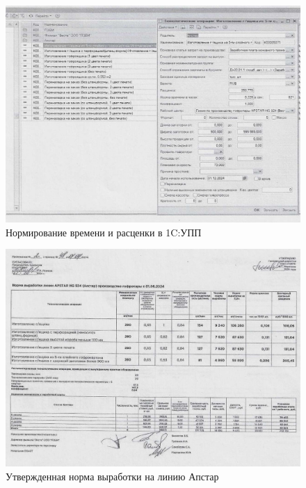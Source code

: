 \begin{figure}
\begin{center}
\includegraphics[height=0.6\textheight, width=1.3\textwidth, angle=90, keepaspectratio]{Pics/XI.12.jpg}
\end{center}
\caption{Нормирование времени и расценки в 1C:УПП}
\label{pic:XI.12.jpg}
\end{figure}
\clearpage

\begin{figure}
\begin{center}
\includegraphics[height=0.6\textheight, width=1.3\textwidth, angle=90, keepaspectratio]{Pics/XI.11.jpg}
\end{center}
\caption{Утвержденная норма выработки на линию Апстар}
\label{pic:XI.11.jpg}
\end{figure}
\clearpage

